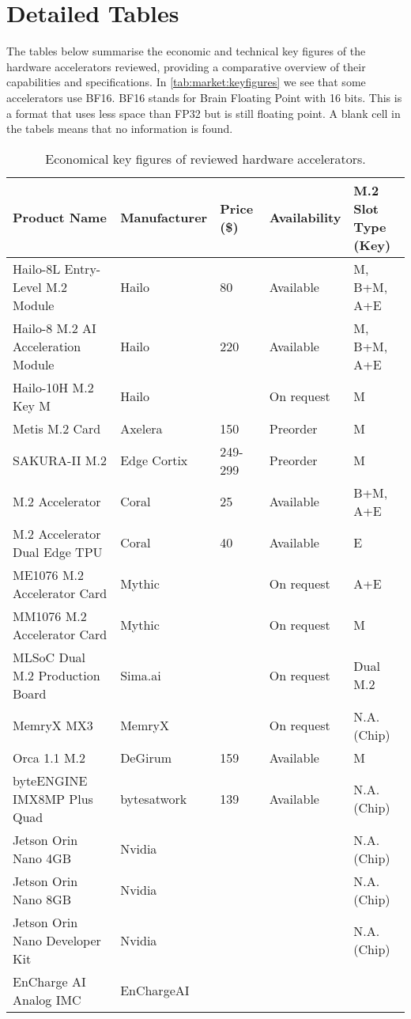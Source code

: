\section{Detailed Tables}
The tables below summarise the economic and technical key figures of the hardware accelerators reviewed, providing a comparative overview of their capabilities and specifications.
In \cref{tab:market:keyfigures} we see that some accelerators use BF16.
BF16 stands for Brain Floating Point with 16 bits.
This is a format that uses less space than FP32 but is still floating point.
A blank cell in the tabels means that no information is found.
\begin{table}[!ht]
    \centering
    \begin{tabular}{|l|l|l|l|l|}
    \hline
        Product Name & Manufacturer & Price (\$) & Availability & \makecell{M.2 Slot\\Type (Key)} \\ \hline
        Hailo-8L Entry-Level M.2 Module & Hailo & 80 & Available & M, B+M, A+E \\ \hline
        Hailo-8 M.2 AI Acceleration Module & Hailo & 220 & Available & M, B+M, A+E \\ \hline
        Hailo-10H M.2 Key M & Hailo & ~ & On request & M \\ \hline
        Metis M.2 Card & Axelera & 150 & Preorder & M \\ \hline
        SAKURA-II M.2 & Edge Cortix & 249-299 & Preorder & M \\ \hline
        M.2 Accelerator & Coral & 25 & Available & B+M, A+E \\ \hline
        M.2 Accelerator Dual Edge TPU & Coral & 40 & Available & E \\ \hline
        ME1076 M.2 Accelerator Card & Mythic & ~ & On request & A+E \\ \hline
        MM1076 M.2 Accelerator Card & Mythic & ~ & On request & M \\ \hline
        MLSoC Dual M.2 Production Board & Sima.ai & ~ & On request & Dual M.2 \\ \hline
        MemryX MX3 & MemryX & ~ & On request & N.A.(Chip) \\ \hline
        Orca 1.1 M.2 & DeGirum & 159 & Available & M \\ \hline
        byteENGINE IMX8MP Plus Quad & bytesatwork & 139 & Available & N.A.(Chip) \\ \hline
        Jetson Orin Nano 4GB & Nvidia & ~ & ~ & N.A.(Chip) \\ \hline
        Jetson Orin Nano 8GB & Nvidia & ~ & ~ & N.A.(Chip) \\ \hline
        Jetson Orin Nano Developer Kit & Nvidia & ~ & ~ & N.A.(Chip) \\ \hline
        EnCharge AI Analog IMC & EnChargeAI & ~ & ~ & ~ \\ \hline
    \end{tabular}
    \caption{Economical key figures of reviewed hardware accelerators.}
    \label{tab:market:ecotable}
\end{table}

